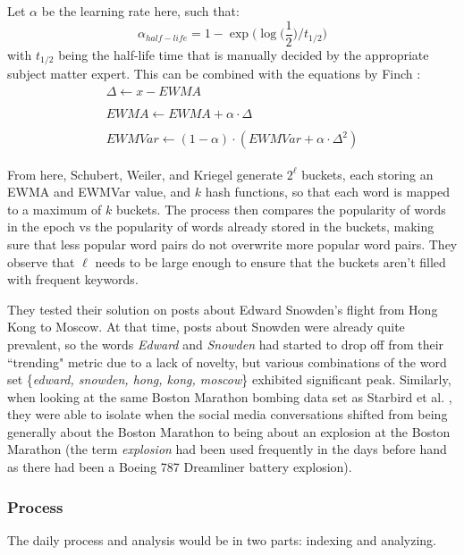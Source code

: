 \documentclass[preprint,review,12pt]{elsarticle}
\begin{document}
Let $\alpha$ be the learning rate here, such that:
\[
\alpha_{half-life} = 1 - \exp\big(\log \big(\frac{1}{2}\big)/t_{1/2}\big)
\]
with $t_{1/2}$ being the half-life time that is manually decided by the appropriate subject matter expert.
This can be combined with the equations by Finch \cite{finch2009incremental}:
\begin{equation}
    \label{Finch Equations}
    \begin{split}
        \Delta  \xleftarrow[]{}  x - EWMA \\
        EWMA  \xleftarrow[]{}   EWMA + \alpha \cdot \Delta \\
        EWMVar  \xleftarrow[]{} (1-\alpha) \cdot (EWMVar + \alpha \cdot \Delta^2)
    \end{split}
\end{equation}

From here, Schubert, Weiler, and Kriegel generate $2^\ell$ buckets, each storing an EWMA and EWMVar value, and $k$ hash functions, so that each word is mapped to a maximum of $k$ buckets. The process then compares the popularity of words in the epoch vs the popularity of words already stored in the buckets, making sure that less popular word pairs do not overwrite more popular word pairs. They observe that $\ell$ needs to be large enough to ensure that the buckets aren't filled with frequent keywords. 

They tested their solution on posts about Edward Snowden's flight from Hong Kong to Moscow. At that time, posts about Snowden were already quite prevalent, so the words \textit{Edward} and \textit{Snowden} had started to drop off from their ``trending" metric due to a lack of novelty, but various combinations of the word set \{\textit{edward, snowden, hong, kong, moscow}\} exhibited significant peak. Similarly, when looking at the same Boston Marathon bombing data set as Starbird et al. \cite{starbird2014rumors}, they were able to isolate when the social media conversations shifted from being generally about the Boston Marathon to being about an explosion at the Boston Marathon (the term \textit{explosion} had been used frequently in the days before hand as there had been a Boeing 787 Dreamliner battery explosion).

\subsubsection{Process}
The daily process and analysis would be in two parts: indexing and analyzing.
\end{document}
